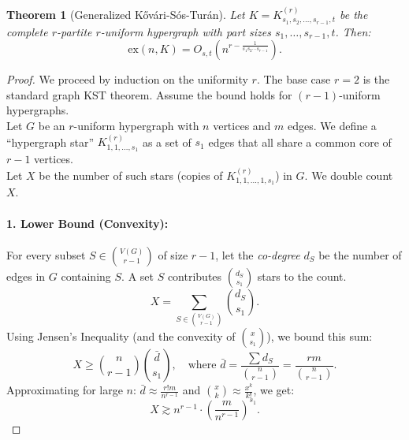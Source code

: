 \documentclass[a4paper]{article}
\newtheorem{thm}{Theorem}[section]
\begin{document}
\begin{thm}[Generalized K\H{o}v\'{a}ri-S\'{o}s-Tur\'{a}n]
    Let $K = K_{s_1,s_2,\ldots,s_{r-1},t}^{(r)}$ be the complete $r$-partite $r$-uniform hypergraph with part sizes $s_1, \dots, s_{r-1}, t$. Then:
    \[
    \text{ex}(n, K) = O_{s,t}\left(n^{r-\frac{1}{s_1 s_2 \cdots s_{r-1}}}\right).
    \]
\end{thm}
\begin{proof}
        We proceed by induction on the uniformity $r$. The base case $r=2$ is the standard graph KST theorem. Assume the bound holds for $(r-1)$-uniform hypergraphs.\\
        Let $G$ be an $r$-uniform hypergraph with $n$ vertices and $m$ edges. We define a ``hypergraph star'' $K_{1, 1, \dots, s_1}^{(r)}$ as a set of $s_1$ edges that all share a common core of $r-1$ vertices.\\
        Let $X$ be the number of such stars (copies of $K_{1,1,...,1,s_1}^{(r)}$) in $G$. We double count $X$.
        \paragraph{1. Lower Bound (Convexity):}
        For every subset $S \in \binom{V(G)}{r-1}$ of size $r-1$, let the \emph{co-degree} $d_S$ be the number of edges in $G$ containing $S$. A set $S$ contributes $\binom{d_S}{s_1}$ stars to the count.
        \[
        X = \sum_{S\in \binom{V(G)}{r-1}} \binom{d_S}{s_1}.
        \]
        Using Jensen's Inequality (and the convexity of $\binom{x}{s_1}$), we bound this sum:
        \[
        X \geq \binom{n}{r-1} \binom{\bar{d}}{s_1}, \quad \text{where } \bar{d} = \frac{\sum d_S}{\binom{n}{r-1}} = \frac{rm}{\binom{n}{r-1}}.
        \]
        Approximating for large $n$: $\bar{d} \approx \frac{r! m}{n^{r-1}}$ and $\binom{x}{k} \approx \frac{x^k}{k!}$, we get:
        \begin{equation} \label{eq:lower}
            X \gtrsim n^{r-1} \cdot \left( \frac{m}{n^{r-1}} \right)^{s_1}.
        \end{equation}


\end{proof}
\end{document}
